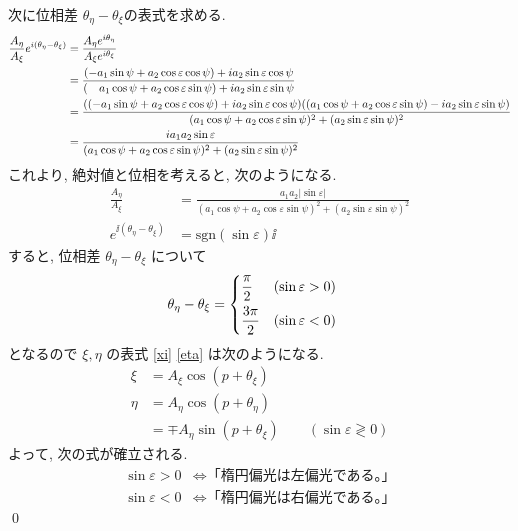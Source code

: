 \documentclass[uplatex,dvipdfmx,a4paper,11pt]{jlreq}
\makeatletter
\theoremstyle{definition}
\renewenvironment{proof}[1][\proofname]{\par
  \normalfont
  \topsep6\p@\@plus6\p@ \trivlist
  \item[\hskip\labelsep{\bfseries #1}\@addpunct{\bfseries}]\ignorespaces\quad\par
}{%
  \qed\endtrivlist\@endpefalse
}
\renewcommand\proofname{証明}
\makeatother
\begin{document}
\begin{proof}
  次に位相差 $\theta_\eta - \theta_\xi$の表式を求める.
  \begin{align}
    \frac{A_\eta}{A_\xi}e^{i(\theta_\eta - \theta_\xi)}
     & = \frac{A_\eta e^{i\theta_\eta}}{A_\xi e^{i\theta_\xi}}                                                                                                                                                                                                 \\
     & = \frac{(-a_1\sin\psi + a_2\cos\varepsilon\cos\psi) + i a_2\sin\varepsilon\cos\psi}{(\quad a_1\cos\psi + a_2\cos\varepsilon\sin\psi) + i a_2\sin\varepsilon\sin\psi}                                                                                    \\
     & = \frac{\qty((-a_1\sin\psi + a_2\cos\varepsilon\cos\psi) + i a_2\sin\varepsilon\cos\psi)\qty((a_1\cos\psi + a_2\cos\varepsilon\sin\psi) - i a_2\sin\varepsilon\sin\psi)}{(a_1\cos\psi + a_2\cos\varepsilon\sin\psi)^2 + (a_2\sin\varepsilon\sin\psi)^2} \\
     & = \frac{i a_1a_2\sin\varepsilon}{(a_1\cos\psi + a_2\cos\varepsilon\sin\psi)^2 + (a_2\sin\varepsilon\sin\psi)^2}
  \end{align}
  これより, 絶対値と位相を考えると, 次のようになる.
  \begin{align}
    \frac{A_\eta}{A_\xi}              & = \frac{a_1a_2\lvert\sin\varepsilon\rvert}{(a_1\cos\psi + a_2\cos\varepsilon\sin\psi)^2 + (a_2\sin\varepsilon\sin\psi)^2} \\
    e^{\ii(\theta_\eta - \theta_\xi)} & = \mathrm{sgn}(\sin\varepsilon)\ii
  \end{align}
  すると, 位相差 $\theta_\eta - \theta_\xi$ について
  \begin{align}
    \theta_\eta - \theta_\xi & =
    \begin{dcases}
      \frac{\pi}{2}  & (\sin\varepsilon > 0) \\
      \frac{3\pi}{2} & (\sin\varepsilon < 0)
    \end{dcases}
  \end{align}
  となるので $\xi, \eta$ の表式 \eqref{xi} \eqref{eta} は次のようになる.
  \begin{align}
    \xi  & = A_\xi\cos(p + \theta_\xi)                                          \\
    \eta & = A_\eta\cos(p + \theta_\eta)                                        \\
         & = \mp A_\eta\sin(p + \theta_\xi) \qquad (\sin\varepsilon \gtrless 0)
  \end{align}
  よって, 次の式が確立される.
  \begin{align}
    \sin\varepsilon > 0 & \iff \textrm{「楕円偏光は左偏光である。」} \\
    \sin\varepsilon < 0 & \iff \textrm{「楕円偏光は右偏光である。」}
  \end{align}
\end{proof}
\end{document}
